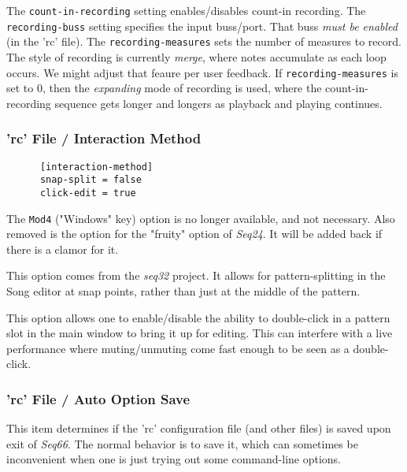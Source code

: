   The \texttt{count-in-recording} setting enables/disables count-in
   recording.
   The \texttt{recording-buss} setting specifies the input buss/port.
   That buss \textsl{must be enabled} (in the 'rc' file).
   The \texttt{recording-measures} sets the number of measures to record.
   The style of recording is currently \textsl{merge},
   where notes accumulate as each loop occurs.
   We might adjust that feaure per user feedback.
   If \texttt{recording-measures} is set to 0, then the
   \textsl{expanding} mode of recording is used, where
   the count-in-recording sequence gets longer and longers
   as playback and playing continues.

\subsubsection{'rc' File / Interaction Method}
\label{subsubsec:configuration_rc_interaction}

   \begin{verbatim}
      [interaction-method]
      snap-split = false
      click-edit = true
   \end{verbatim}

   The \texttt{Mod4} ("Windows" key) option is no longer available, and not
   necessary.
   Also removed is the option for the "fruity" option of \textsl{Seq24}.
   It will be added back if there is a clamor for it.

   This option comes from the \textsl{seq32} project.  It allows for
   pattern-splitting in the Song editor at snap points, rather than just
   at the middle of the pattern.

   This option allows one to enable/disable the ability to double-click
   in a pattern slot in the main window to bring it up for editing.
   This can interfere with a live performance where muting/unmuting come fast
   enough to be seen as a double-click.

\subsubsection{'rc' File / Auto Option Save}
\label{subsubsec:configuration_rc_auto_option_save}

   This item determines if the 'rc' configuration file (and other files)
   is saved upon exit of \textsl{Seq66}.
   The normal behavior is to save it,
   which can sometimes be inconvenient when one is just trying out some
   command-line options.


